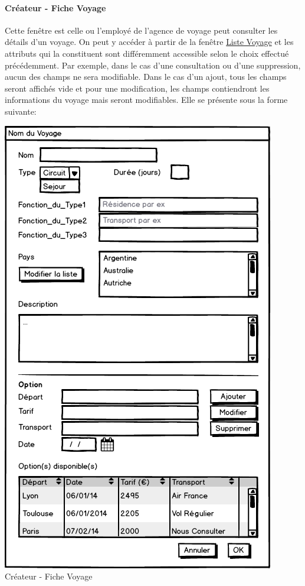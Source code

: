 \documentclass[12pt]{article}
\begin{document}
\paragraph{Créateur - Fiche Voyage}
Cette fenêtre est celle ou l'employé de l'agence de voyage peut consulter les détails d'un voyage. On peut y accéder à partir de la fenêtre \hyperref[fig:Cr-Liste_Voyage]{Liste Voyage} et les attributs qui la constituent sont différemment accessible selon le choix effectué précédemment. Par exemple, dans le cas d'une consultation ou d'une suppression, aucun des champs ne sera modifiable. Dans le cas d'un ajout, tous les champs seront affichés vide et pour une modification, les champs contiendront les informations du voyage mais seront modifiables. Elle se présente sous la forme suivante:
\begin{center}
\includegraphics[scale = 0.5]{../Conception_graphique/png_Pour_CR/Createur-30-Fiche_Voyage.png}
\newline
Créateur - Fiche Voyage
\label{fig:Cr-Fiche Voyage}
\end{center}
\end{document}
